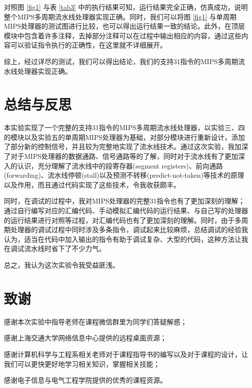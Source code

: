 \documentclass{cumcm}
\numberwithin{equation}{section}
\numberwithin{equation}{subsection}
\begin{document}
对照图 \ref{fig1} 与表 \ref{tab3} 中的执行结果可知，运行结果完全正确，仿真成功，说明整个MIPS多周期流水线处理器实现正确。同时，我们可以将图 \ref{fig1} 与单周期MIPS处理器的测试图进行比较，也可以得出运行结果一致的结论。此外，在顶层模块中包含着许多注释，去掉部分注释可以在过程中输出相应的内容，通过这些内容可以验证指令执行的正确性，在这里就不详细展开。

综上，经过详尽的测试，我们可以得出结论，我们的支持31指令的MIPS多周期流水线处理器实现正确。

\section{总结与反思}\label{section5}

本实验实现了一个完整的支持31指令的MIPS多周期流水线处理器，以实验三、四的模块以及实验五的单周期MIPS处理器为基础，对部分模块进行重新设计，添加了部分新的控制信号，并且较为完整地实现了流水线技术。通过这次实验，我加深了对于MIPS处理器的数据通路、信号通路等的了解，同时对于流水线有了更加深入的认识，充分理解了流水线中的段寄存器(segment registers)、前向通路(forwarding)、流水线停顿(stall)以及预测不转移(predict-not-taken)等技术的原理以及作用，而且通过代码实现了这些技术，令我收获颇丰。

同时，在调试的过程中，我对MIPS处理器的完整31指令也有了更加深刻的理解；通过自行编写对应的汇编代码、手动模拟汇编代码的运行结果、与自己写的处理器的运行结果进行对照等过程，对汇编代码也有了更加深刻的理解。同时，由于多周期处理器的调试过程中同时涉及多条指令，调试起来比较麻烦，总结调试的经验我认为，适当在代码中加入输出的指令有助于调试复杂、大型的代码，这种方法让我在调试流水线时省下了不少力气。

总之，我认为这次实验令我受益匪浅。


\section{致谢}\label{section6}
感谢本次实验中指导老师在课程微信群里为同学们答疑解惑；

感谢上海交通大学网络信息中心提供的远程桌面资源；

感谢计算机科学与工程系相关老师对于课程指导书的编写以及对于课程的设计，让我们可以更快更好地学习相关知识，掌握相关技能；

感谢电子信息与电气工程学院提供的优秀的课程资源。
%
%
\end{document}

